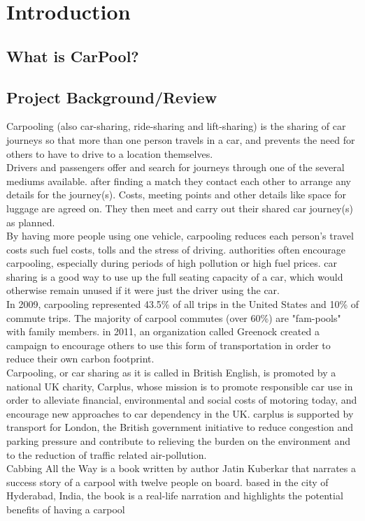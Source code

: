 \chapter{Introduction} \label{chap:intro}

\section*{What is CarPool?}

\section{Project Background/Review}
\justify
Carpooling (also car-sharing, ride-sharing and lift-sharing) is the sharing of car journeys so that more than one person travels in a car, and prevents the need for others to have to drive to a location themselves.
\\ Drivers and passengers offer and search for journeys through one of the several mediums available. after finding a match they contact each other to arrange any details for the journey(s). Costs, meeting points and other details like space for luggage are agreed on. They then meet and carry out their shared car journey(s) as planned.
\\ By having more people using one vehicle, carpooling reduces each person's travel costs such fuel costs, tolls and the stress of driving. authorities often encourage carpooling, especially during periods of high pollution or high fuel prices. car sharing is a good way to use up the full seating capacity of a car, which would otherwise remain unused if it were just the driver using the car.
\\ In 2009, carpooling represented 43.5\% of all trips in the United States and 10\% of commute trips. The majority of carpool commutes (over 60\%) are "fam-pools" with family members.
in 2011, an organization called Greenock created a campaign to encourage others to use this form of transportation in order to reduce their own carbon footprint.
\\ Carpooling, or car sharing as it is called in British English, is promoted by a national UK charity, Carplus, whose mission is to promote responsible car use in order to alleviate financial, environmental and social costs of motoring today, and encourage new approaches to car dependency in the UK. carplus is supported by transport for London, the British government initiative to reduce congestion and parking pressure and contribute to relieving the burden on the environment and to the reduction of traffic related air-pollution.
\\ Cabbing All the Way is a book written by author Jatin Kuberkar that narrates a success story of a carpool with twelve people on board. based in the city of Hyderabad, India, the book is a real-life narration and highlights the potential benefits of having a carpool

